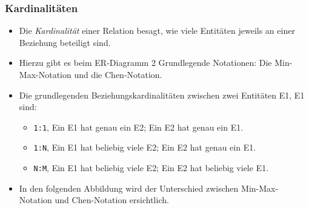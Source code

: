             \subsubsection{Kardinalitäten} %
                \begin{itemize}
                	\item Die \textit{Kardinalität} einer Relation besagt, wie viele Entitäten jeweils an einer Beziehung beteiligt sind.
                	\item Hierzu gibt es beim ER-Diagramm 2 Grundlegende Notationen: Die Min-Max-Notation und die Chen-Notation.
                	\item Die grundlegenden Beziehungskardinalitäten zwischen zwei Entitäten E1, E1 sind:
                		\begin{itemize}
                			\item \texttt{1:1}, Ein E1 hat genau ein E2; Ein E2 hat genau ein E1.
                			\item \texttt{1:N}, Ein E1 hat beliebig viele E2; Ein E2 hat genau ein E1.
                			\item \texttt{N:M}, Ein E1 hat beliebig viele E2; Ein E2 hat beliebig viele E1.
                		\end{itemize}
                	\item In den folgenden Abbildung wird der Unterschied zwischen \textcolor{TUDa-4\IfDarkModeTF{a}{c}}{Min-Max-Notation} und \textcolor{TUDa-1\IfDarkModeTF{a}{b}}{Chen-Notation} ersichtlich.
                \end{itemize}
            
